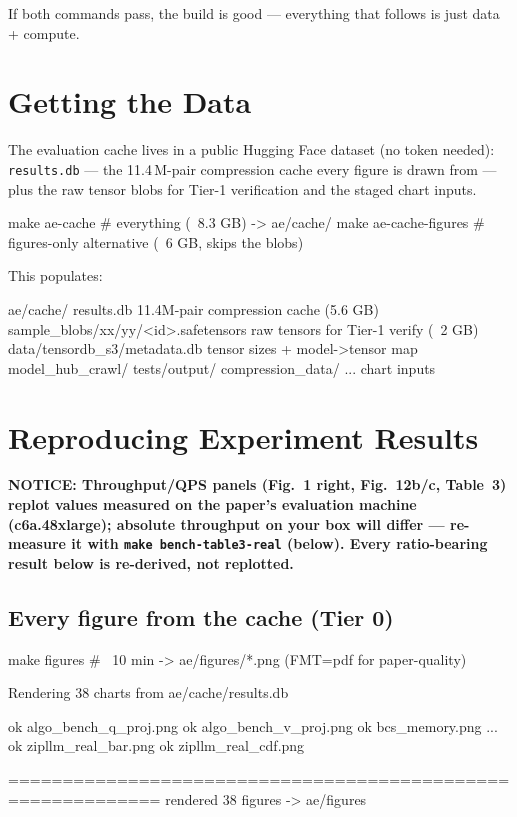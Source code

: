 \documentclass[11pt]{article}
\newcommand{\code}[1]{\texttt{#1}}
\newcommand{\notice}[1]{{\color{noticeblue}\bfseries NOTICE: #1\par}}
\begin{document}
If both commands pass, the build is good --- everything that follows is just
data + compute.

\section{Getting the Data}

The evaluation cache lives in a public Hugging Face dataset (no token
needed): \code{results.db} --- the 11.4\,M-pair compression cache every
figure is drawn from --- plus the raw tensor blobs for Tier-1 verification
and the staged chart inputs.

\begin{shell}
make ae-cache            # everything (~8.3 GB) -> ae/cache/
make ae-cache-figures    # figures-only alternative (~6 GB, skips the blobs)
\end{shell}

This populates:

\begin{term}
ae/cache/
  results.db                       11.4M-pair compression cache (5.6 GB)
  sample_blobs/xx/yy/<id>.safetensors   raw tensors for Tier-1 verify (~2 GB)
  data/tensordb_s3/metadata.db     tensor sizes + model->tensor map
  model_hub_crawl/  tests/output/  compression_data/  ...   chart inputs
\end{term}

\section{Reproducing Experiment Results}

\notice{Throughput/QPS panels (Fig.~1 right, Fig.~12b/c, Table~3) replot
values measured on the paper's evaluation machine (c6a.48xlarge); absolute
throughput on your box will differ --- re-measure it with
\code{make bench-table3-real} (below). Every ratio-bearing result below is
re-derived, not replotted.}

\subsection{Every figure from the cache (Tier 0)}

\begin{shell}
make figures        # ~10 min -> ae/figures/*.png   (FMT=pdf for paper-quality)
\end{shell}
\begin{term}
Rendering 38 charts from ae/cache/results.db

  ok   algo_bench_q_proj.png
  ok   algo_bench_v_proj.png
  ok   bcs_memory.png
  ...
  ok   zipllm_real_bar.png
  ok   zipllm_real_cdf.png

============================================================
rendered 38 figures -> ae/figures
\end{term}
\end{document}
